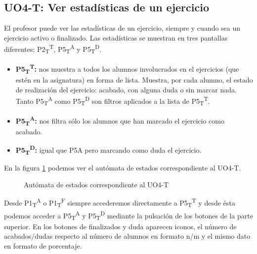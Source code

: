 \subsection{UO4-T: Ver estadísticas de un ejercicio}
\label{analisis-de-requisitos:funcionales:uo4t}

El profesor puede ver las estadísticas de un ejercicio, siempre y cuando sea un ejercicio activo o finalizado. Las estadísticas se muestran en tres pantallas diferentes: P2\textsubscript{T}\textsuperscript{T}, P5\textsubscript{T}\textsuperscript{A} y P5\textsubscript{T}\textsuperscript{D}.

\begin{itemize}
\item \textbf{P5\textsubscript{T}\textsuperscript{T}:} nos muestra a todos los alumnos involucrados en el ejercicios (que estén en la asignatura) en forma de lista. Muestra, por cada alumno, el estado de realización del ejercicio: acabado, con alguna duda o sin marcar nada.\\

Tanto P5\textsubscript{T}\textsuperscript{A} como P5\textsubscript{T}\textsuperscript{D} son filtros aplicados a la lista de P5\textsubscript{T}\textsuperscript{T}.
\item \textbf{P5\textsubscript{T}\textsuperscript{A}:} nos filtra sólo los alumnos que han marcado el ejercicio como acabado.
\item \textbf{P5\textsubscript{T}\textsuperscript{D}:} igual que P5A pero marcando como duda el ejercicio.
\end{itemize}

En la figura \ref{fig:analisis-de-requisitos:funcionales:uo4t:fsm} podemos ver el autómata de estados correspondiente al UO4-T.\\

\noindent
\begin{figure}[!htbp]
\noindent
{}
\caption{Autómata de estados correspondiente al UO4-T}
\label{fig:analisis-de-requisitos:funcionales:uo4t:fsm}
\end{figure}

Desde P1\textsubscript{T}\textsuperscript{A} o P1\textsubscript{T}\textsuperscript{F} siempre accederemos directamente a P5\textsubscript{T}\textsuperscript{T} y desde ésta podemos acceder a P5\textsubscript{T}\textsuperscript{A} y P5\textsubscript{T}\textsuperscript{D} mediante la pulsación de los botones de la parte superior. En los botones de finalizados y duda aparecen iconos, el número de acabados/dudas respecto al número de alumnos en formato n/m y el mismo dato en formato de porcentaje.\\

